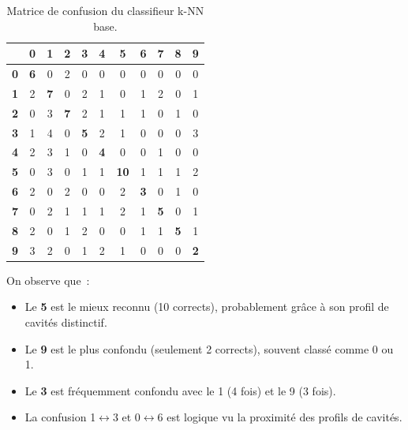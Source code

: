\documentclass[a4paper,11pt]{article}
\begin{document}
\begin{table}[H]
\centering
\caption{Matrice de confusion du classifieur k-NN base.}
\label{tab:confusion}
\small
\begin{tabular}{c|cccccccccc}
\toprule
& \textbf{0} & \textbf{1} & \textbf{2} & \textbf{3} & \textbf{4} & \textbf{5} & \textbf{6} & \textbf{7} & \textbf{8} & \textbf{9} \\
\midrule
\textbf{0} & \textbf{6} & 0 & 2 & 0 & 0 & 0 & 0 & 0 & 0 & 0 \\
\textbf{1} & 2 & \textbf{7} & 0 & 2 & 1 & 0 & 1 & 2 & 0 & 1 \\
\textbf{2} & 0 & 3 & \textbf{7} & 2 & 1 & 1 & 1 & 0 & 1 & 0 \\
\textbf{3} & 1 & 4 & 0 & \textbf{5} & 2 & 1 & 0 & 0 & 0 & 3 \\
\textbf{4} & 2 & 3 & 1 & 0 & \textbf{4} & 0 & 0 & 1 & 0 & 0 \\
\textbf{5} & 0 & 3 & 0 & 1 & 1 & \textbf{10} & 1 & 1 & 1 & 2 \\
\textbf{6} & 2 & 0 & 2 & 0 & 0 & 2 & \textbf{3} & 0 & 1 & 0 \\
\textbf{7} & 0 & 2 & 1 & 1 & 1 & 2 & 1 & \textbf{5} & 0 & 1 \\
\textbf{8} & 2 & 0 & 1 & 2 & 0 & 0 & 1 & 1 & \textbf{5} & 1 \\
\textbf{9} & 3 & 2 & 0 & 1 & 2 & 1 & 0 & 0 & 0 & \textbf{2} \\
\bottomrule
\end{tabular}
\end{table}

On observe que~:
\begin{itemize}
    \item Le \textbf{5} est le mieux reconnu (10 corrects), probablement grâce à son profil de cavités distinctif.
    \item Le \textbf{9} est le plus confondu (seulement 2 corrects), souvent classé comme 0 ou 1.
    \item Le \textbf{3} est fréquemment confondu avec le 1 (4 fois) et le 9 (3 fois).
    \item La confusion 1$\leftrightarrow$3 et 0$\leftrightarrow$6 est logique vu la proximité des profils de cavités.
\end{itemize}

\end{document}
